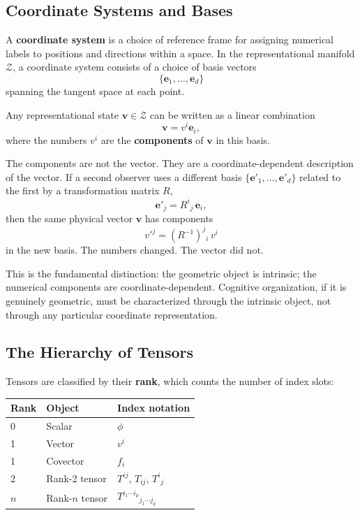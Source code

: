 \documentclass[12pt,a4paper]{article}
\begin{document}
\subsection{Coordinate Systems and Bases}

A \textbf{coordinate system} is a choice of reference frame for assigning numerical labels to positions and directions within a space. In the representational manifold $\mathcal{Z}$, a coordinate system consists of a choice of basis vectors
\[
\{\mathbf{e}_1, \ldots, \mathbf{e}_d\}
\]
spanning the tangent space at each point.

Any representational state $\mathbf{v} \in \mathcal{Z}$ can be written as a linear combination
\[
\mathbf{v} = v^i \mathbf{e}_i,
\]
where the numbers $v^i$ are the \textbf{components} of $\mathbf{v}$ in this basis.

The components are not the vector. They are a coordinate-dependent description of the vector. If a second observer uses a different basis $\{\mathbf{e}'_1, \ldots, \mathbf{e}'_d\}$ related to the first by a transformation matrix $R$,
\[
\mathbf{e}'_j = R^i{}_j \, \mathbf{e}_i,
\]
then the same physical vector $\mathbf{v}$ has components
\[
v'^j = (R^{-1})^j{}_i \, v^i
\]
in the new basis. The numbers changed. The vector did not.

This is the fundamental distinction: the geometric object is intrinsic; the numerical components are coordinate-dependent. Cognitive organization, if it is genuinely geometric, must be characterized through the intrinsic object, not through any particular coordinate representation.

\subsection{The Hierarchy of Tensors}

Tensors are classified by their \textbf{rank}, which counts the number of index slots:

\begin{center}
\begin{tabular}{lll}
\toprule
Rank & Object & Index notation \\
\midrule
0 & Scalar & $\phi$ \\
1 & Vector & $v^i$ \\
1 & Covector & $f_i$ \\
2 & Rank-2 tensor & $T^{ij}$, $T_{ij}$, $T^i{}_j$ \\
$n$ & Rank-$n$ tensor & $T^{i_1 \cdots i_p}{}_{j_1 \cdots j_q}$ \\
\bottomrule
\end{tabular}
\end{center}
\end{document}
